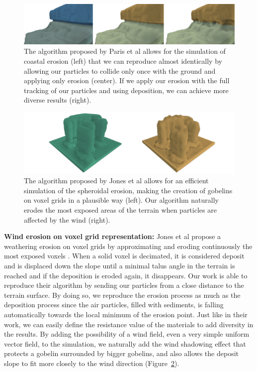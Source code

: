 \begin{figure}
\centering
\includegraphics{otherPapersRepro/costal.pdf}
\caption{The algorithm proposed by Paris et al \cite{Paris2019} allows for the simulation of coastal erosion (left) that we can reproduce almost identically by allowing our particles to collide only once with the ground and applying only erosion (center). If we apply our erosion with the full tracking of our particles and using deposition, we can achieve more diverse results (right).}
\label{fig:erosion_screen-paris2019-1}

\end{figure}
%
\begin{figure}[t]

\centering
\includegraphics[width = \linewidth]{otherPapersRepro/gobelins2.png}
\caption{The algorithm proposed by Jones et al 
\cite{Jones2010} allows for an efficient simulation of the spheroidal erosion, making the creation of gobelins on voxel grids in a plausible way (left). Our algorithm naturally erodes the most exposed areas of the terrain when particles are affected by the wind (right).}
\label{fig:erosion_screen-jones2010}
\end{figure}
%
\textbf{Wind erosion on voxel grid representation: }
Jones et al propose a weathering erosion on voxel grids by approximating and eroding continuously the most exposed voxels \cite{Jones2010}. When a solid voxel is decimated, it is considered deposit and is displaced down the slope until a minimal talus angle in the terrain is reached and if the deposition is eroded again, it disappears. Our work is able to reproduce their algorithm by sending our particles from a close distance to the terrain surface. By doing so, we reproduce the erosion process as much as the deposition process since the air particles, filled with sediments, is falling automatically towards the local minimum of the erosion point. Just like in their work, we can easily define the resistance value of the materials to add diversity in the results. By adding the possibility of a wind field, even a very simple uniform vector field, to the simulation, we naturally add the wind shadowing effect that protects a gobelin surrounded by bigger gobelins, and also allows the deposit slope to fit more closely to the wind direction (Figure~\ref{fig:erosion_screen-jones2010}).

